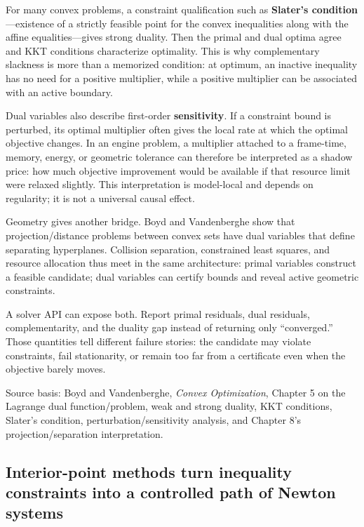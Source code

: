 For many convex problems, a constraint qualification such as \textbf{Slater's condition}---existence of a strictly feasible point for the convex inequalities along with the affine equalities---gives strong duality. Then the primal and dual optima agree and KKT conditions characterize optimality. This is why complementary slackness is more than a memorized condition: at optimum, an inactive inequality has no need for a positive multiplier, while a positive multiplier can be associated with an active boundary.

Dual variables also describe first-order \textbf{sensitivity}. If a constraint bound is perturbed, its optimal multiplier often gives the local rate at which the optimal objective changes. In an engine problem, a multiplier attached to a frame-time, memory, energy, or geometric tolerance can therefore be interpreted as a shadow price: how much objective improvement would be available if that resource limit were relaxed slightly. This interpretation is model-local and depends on regularity; it is not a universal causal effect.

Geometry gives another bridge. Boyd and Vandenberghe show that projection/distance problems between convex sets have dual variables that define separating hyperplanes. Collision separation, constrained least squares, and resource allocation thus meet in the same architecture: primal variables construct a feasible candidate; dual variables can certify bounds and reveal active geometric constraints.

A solver API can expose both. Report primal residuals, dual residuals, complementarity, and the duality gap instead of returning only ``converged.'' Those quantities tell different failure stories: the candidate may violate constraints, fail stationarity, or remain too far from a certificate even when the objective barely moves.

Source basis: Boyd and Vandenberghe, \emph{Convex Optimization}, Chapter 5 on the Lagrange dual function/problem, weak and strong duality, KKT conditions, Slater's condition, perturbation/sensitivity analysis, and Chapter 8's projection/separation interpretation.

\subsection{Interior-point methods turn inequality constraints into a controlled path of Newton systems}\label{02-foundations-ii-ch026-interior-point-methods-turn-inequality-constraints-into-a-controlled-path-of-newton-systems}

